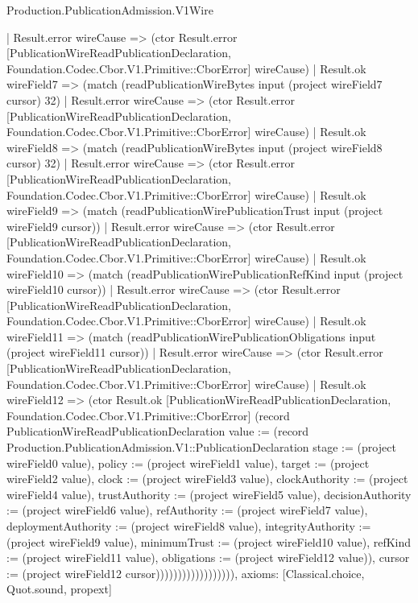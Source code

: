 \begin{lexlean}{Production.PublicationAdmission.V1Wire}
\begin{semanticmodule}
{                      | Result.error wireCause => (ctor Result.error [PublicationWireReadPublicationDeclaration, Foundation.Codec.Cbor.V1.Primitive::CborError] wireCause)
                      | Result.ok wireField7 => (match (readPublicationWireBytes input (project wireField7 cursor) 32)
                        | Result.error wireCause => (ctor Result.error [PublicationWireReadPublicationDeclaration, Foundation.Codec.Cbor.V1.Primitive::CborError] wireCause)
                        | Result.ok wireField8 => (match (readPublicationWireBytes input (project wireField8 cursor) 32)
                          | Result.error wireCause => (ctor Result.error [PublicationWireReadPublicationDeclaration, Foundation.Codec.Cbor.V1.Primitive::CborError] wireCause)
                          | Result.ok wireField9 => (match (readPublicationWirePublicationTrust input (project wireField9 cursor))
                            | Result.error wireCause => (ctor Result.error [PublicationWireReadPublicationDeclaration, Foundation.Codec.Cbor.V1.Primitive::CborError] wireCause)
                            | Result.ok wireField10 => (match (readPublicationWirePublicationRefKind input (project wireField10 cursor))
                              | Result.error wireCause => (ctor Result.error [PublicationWireReadPublicationDeclaration, Foundation.Codec.Cbor.V1.Primitive::CborError] wireCause)
                              | Result.ok wireField11 => (match (readPublicationWirePublicationObligations input (project wireField11 cursor))
                                | Result.error wireCause => (ctor Result.error [PublicationWireReadPublicationDeclaration, Foundation.Codec.Cbor.V1.Primitive::CborError] wireCause)
                                | Result.ok wireField12 => (ctor Result.ok [PublicationWireReadPublicationDeclaration, Foundation.Codec.Cbor.V1.Primitive::CborError] (record PublicationWireReadPublicationDeclaration {value := (record Production.PublicationAdmission.V1::PublicationDeclaration {stage := (project wireField0 value), policy := (project wireField1 value), target := (project wireField2 value), clock := (project wireField3 value), clockAuthority := (project wireField4 value), trustAuthority := (project wireField5 value), decisionAuthority := (project wireField6 value), refAuthority := (project wireField7 value), deploymentAuthority := (project wireField8 value), integrityAuthority := (project wireField9 value), minimumTrust := (project wireField10 value), refKind := (project wireField11 value), obligations := (project wireField12 value)}), cursor := (project wireField12 cursor)}))))))))))))))))),
  axioms: [Classical.choice, Quot.sound, propext]
}


\end{semanticmodule}
\end{lexlean}
